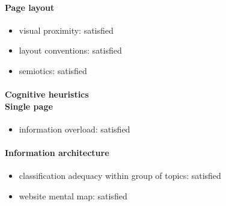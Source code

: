 \begin{enumerate}
	\paragraph*{Page layout}
	\begin{itemize}
		\item visual proximity: satisfied
		\item layout conventions: satisfied
		\item semiotics: satisfied
	\end{itemize}

	\paragraph*{Cognitive heuristics \\ Single page}
	\begin{itemize}
		\item information overload: satisfied
	\end{itemize}	

	\paragraph*{Information architecture}
	\begin{itemize}
		\item classification adequacy within group of topics: satisfied
		\item website mental map: satisfied
	\end{itemize}
	\end{enumerate}